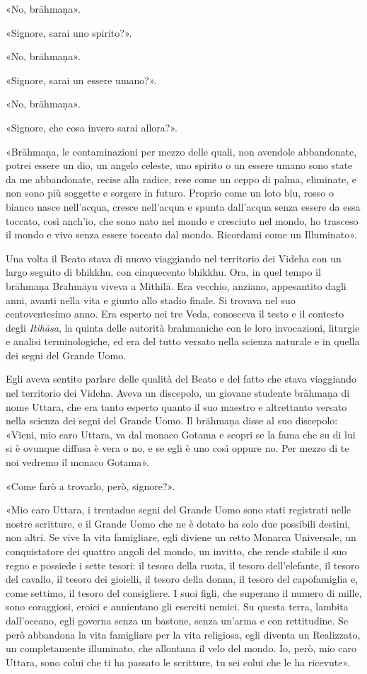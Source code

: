 «No, brāhmaṇa».

«Signore, sarai uno spirito?».

«No, brāhmaṇa».

«Signore, sarai un essere umano?».

«No, brāhmaṇa».

«Signore, che cosa invero sarai allora?».

«Brāhmaṇa, le contaminazioni per mezzo delle quali, non avendole abbandonate,
potrei essere un dio, un angelo celeste, uno spirito o un essere umano sono
state da me abbandonate, recise alla radice, rese come un ceppo di palma,
eliminate, e non sono più soggette e sorgere in futuro. Proprio come un loto
blu, rosso o bianco nasce nell’acqua, cresce nell’acqua e spunta dall’acqua
senza essere da essa toccato, così anch’io, che sono nato nel mondo e cresciuto
nel mondo, ho trasceso il mondo e vivo senza essere toccato dal mondo. Ricordami
come un Illuminato».


Una volta il Beato stava di nuovo viaggiando nel territorio dei Videha con un
largo seguito di bhikkhu, con cinquecento bhikkhu. Ora, in quel tempo il
brāhmaṇa Brahmāyu viveva a Mithilā. Era vecchio, anziano, appesantito dagli
anni, avanti nella vita e giunto allo stadio finale. Si trovava nel suo
centoventesimo anno. Era esperto nei tre Veda, conosceva il testo e il contesto
degli \emph{Itihāsa}, la quinta delle autorità brahmaniche con le loro
invocazioni, liturgie e analisi terminologiche, ed era del tutto versato nella
scienza naturale e in quella dei segni del Grande Uomo.

Egli aveva sentito parlare delle qualità del Beato e del fatto che stava
viaggiando nel territorio dei Videha. Aveva un discepolo, un giovane studente
brāhmaṇa di nome Uttara, che era tanto esperto quanto il suo maestro e
altrettanto versato nella scienza dei segni del Grande Uomo. Il brāhmaṇa disse
al suo discepolo: «Vieni, mio caro Uttara, va dal monaco Gotama e scopri se la
fama che su di lui si è ovunque diffusa è vera o no, e se egli è uno così oppure
no. Per mezzo di te noi vedremo il monaco Gotama».

«Come farò a trovarlo, però, signore?».

«Mio caro Uttara, i trentadue segni del Grande Uomo sono stati registrati nelle
nostre scritture, e il Grande Uomo che ne è dotato ha solo due possibili
destini, non altri. Se vive la vita famigliare, egli diviene un retto Monarca
Universale, un conquistatore dei quattro angoli del mondo, un invitto, che rende
stabile il suo regno e possiede i sette tesori: il tesoro della ruota, il tesoro
dell’elefante, il tesoro del cavallo, il tesoro dei gioielli, il tesoro della
donna, il tesoro del capofamiglia e, come settimo, il tesoro del consigliere. I
suoi figli, che superano il numero di mille, sono coraggiosi, eroici e
annientano gli eserciti nemici. Su questa terra, lambita dall’oceano, egli
governa senza un bastone, senza un’arma e con rettitudine. Se però abbandona la
vita famigliare per la vita religiosa, egli diventa un Realizzato, un
completamente illuminato, che allontana il velo del mondo. Io, però, mio caro
Uttara, sono colui che ti ha passato le scritture, tu sei colui che le ha
ricevute».

